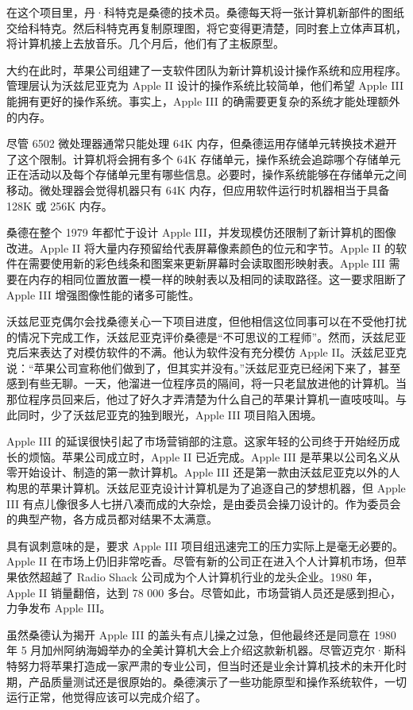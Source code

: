 \documentclass[12pt,UTF8]{ctexbook}
\begin{document}
在这个项目里，丹·科特克是桑德的技术员。桑德每天将一张计算机新部件的图纸交给科特克。然后科特克再复制原理图，将它变得更清楚，同时套上立体声耳机，将计算机接上去放音乐。几个月后，他们有了主板原型。

大约在此时，苹果公司组建了一支软件团队为新计算机设计操作系统和应用程序。管理层认为沃兹尼亚克为 Apple II 设计的操作系统比较简单，他们希望 Apple III 能拥有更好的操作系统。事实上，Apple III 的确需要更复杂的系统才能处理额外的内存。

尽管 6502 微处理器通常只能处理 64K 内存，但桑德运用存储单元转换技术避开了这个限制。计算机将会拥有多个 64K 存储单元，操作系统会追踪哪个存储单元正在活动以及每个存储单元里有哪些信息。必要时，操作系统能够在存储单元之间移动。微处理器会觉得机器只有 64K 内存，但应用软件运行时机器相当于具备 128K 或 256K 内存。

桑德在整个 1979 年都忙于设计 Apple III，并发现模仿还限制了新计算机的图像改进。Apple II 将大量内存预留给代表屏幕像素颜色的位元和字节。Apple II 的软件在需要使用新的彩色线条和图案来更新屏幕时会读取图形映射表。Apple III 需要在内存的相同位置放置一模一样的映射表以及相同的读取路径。这一要求阻断了 Apple III 增强图像性能的诸多可能性。

沃兹尼亚克偶尔会找桑德关心一下项目进度，但他相信这位同事可以在不受他打扰的情况下完成工作，沃兹尼亚克评价桑德是“不可思议的工程师”。然而，沃兹尼亚克后来表达了对模仿软件的不满。他认为软件没有充分模仿 Apple II。沃兹尼亚克说：“苹果公司宣称他们做到了，但其实并没有。”沃兹尼亚克已经闲下来了，甚至感到有些无聊。一天，他溜进一位程序员的隔间，将一只老鼠放进他的计算机。当那位程序员回来后，他过了好久才弄清楚为什么自己的苹果计算机一直吱吱叫。与此同时，少了沃兹尼亚克的独到眼光，Apple III 项目陷入困境。

Apple III 的延误很快引起了市场营销部的注意。这家年轻的公司终于开始经历成长的烦恼。苹果公司成立时，Apple II 已近完成。Apple III 是苹果以公司名义从零开始设计、制造的第一款计算机。Apple III 还是第一款由沃兹尼亚克以外的人构思的苹果计算机。沃兹尼亚克设计计算机是为了追逐自己的梦想机器，但 Apple III 有点儿像很多人七拼八凑而成的大杂烩，是由委员会操刀设计的。作为委员会的典型产物，各方成员都对结果不太满意。

具有讽刺意味的是，要求 Apple III 项目组迅速完工的压力实际上是毫无必要的。Apple II 在市场上仍旧非常吃香。尽管有新的公司正在进入个人计算机市场，但苹果依然超越了 Radio Shack 公司成为个人计算机行业的龙头企业。1980 年，Apple II 销量翻倍，达到 78 000 多台。尽管如此，市场营销人员还是感到担心，力争发布 Apple III。

虽然桑德认为揭开 Apple III 的盖头有点儿操之过急，但他最终还是同意在 1980 年 5 月加州阿纳海姆举办的全美计算机大会上介绍这款新机器。尽管迈克尔·斯科特努力将苹果打造成一家严肃的专业公司，但当时还是业余计算机技术的未开化时期，产品质量测试还是很原始的。桑德演示了一些功能原型和操作系统软件，一切运行正常，他觉得应该可以完成介绍了。
\end{document}
